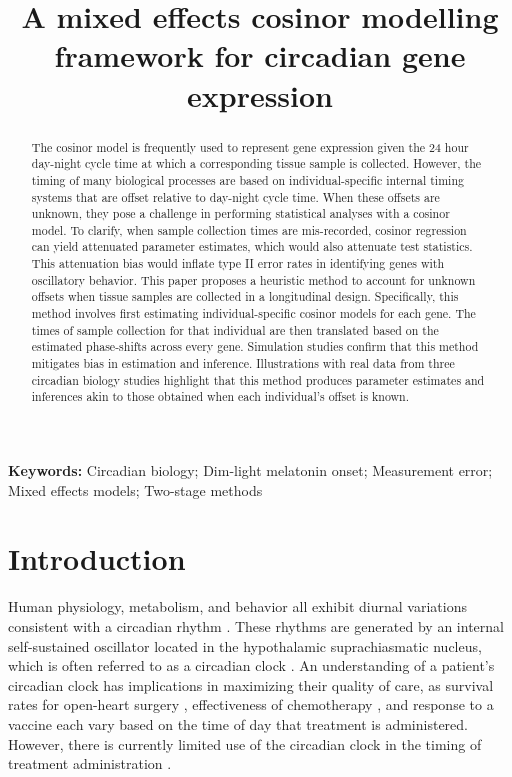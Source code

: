 
\title{A mixed effects cosinor modelling framework for circadian gene expression}
\maketitle
\begin{abstract}
\noindent The cosinor model is frequently used to represent gene expression given the 24 hour day-night cycle time at which a corresponding tissue sample is collected. However, the timing of many biological processes are based on individual-specific internal timing systems that are offset relative to day-night cycle time. When these offsets are unknown, they pose a challenge in performing statistical analyses with a cosinor model. To clarify, when sample collection times are mis-recorded, cosinor regression can yield attenuated parameter estimates, which would also attenuate test statistics. This attenuation bias would inflate type II error rates in identifying genes with oscillatory behavior. This paper proposes a heuristic method to account for unknown offsets when tissue samples are collected in a longitudinal design. Specifically, this method involves first estimating individual-specific cosinor models for each gene. The times of sample collection for that individual are then translated based on the estimated phase-shifts across every gene. Simulation studies confirm that this method mitigates bias in estimation and inference. Illustrations with real data from three circadian biology studies highlight that this method produces parameter estimates and inferences akin to those obtained when each individual's offset is known.

 \end{abstract}

{\bf Keywords: } Circadian biology; Dim-light melatonin onset;  Measurement error; Mixed effects models; Two-stage methods

\section{Introduction} \label{sec:1}


Human physiology, metabolism, and behavior all exhibit diurnal variations consistent with a circadian rhythm \citep{Marcheva2013}. These rhythms are generated by an internal self-sustained oscillator located in the hypothalamic suprachiasmatic nucleus, which is often referred to as a circadian clock \citep{Bae2001, Hastings2018, Herzog2017, Yamaguchi2003}. An understanding of a patient's circadian clock has implications in maximizing their quality of care, as survival rates for open-heart surgery \citep{Montaigne2018}, effectiveness of chemotherapy \citep{Dallmann2016}, and response to a vaccine \citep{Long2016} each vary based on the time of day that treatment is administered. However, there is currently limited use of the circadian clock in the timing of treatment administration \citep{Dallmann2014, Wittenbrink2018}.


